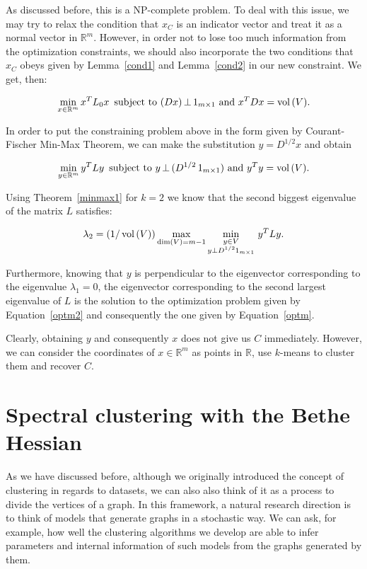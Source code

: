 As discussed before, this is a NP-complete problem.
To deal with this issue, we may try to relax the condition that $x_C$ is an indicator vector and treat it as a normal vector in $\mathbb R^{m }$.
However, in order not to lose too much information from the optimization constraints, we should also incorporate the two conditions that $x_C$ obeys given by Lemma~\ref{cond1} and Lemma~\vref{cond2} in our new constraint. We get, then:

\begin{equation}
   \min_{x \in \mathbb R^{m }} {x}^TL_0{x}\,\text{ subject to } (Dx)\, \bot \, 1_{m \times 1}  \text{ and } x^T D x = \operatorname*{vol\,} (V).
\end{equation}

In order to put the constraining problem above in the form given by Courant-Fischer Min-Max Theorem, we can make the substitution $y = D^{1/2}x$ and obtain

\begin{equation} \label{optm}
   \min_{y \in \mathbb R^{m }} y^TLy \,\text{ subject to } y \, \bot \, (D^{1/2} \,1_{m \times 1}) \text{ and } y^T y = \operatorname*{vol\,} (V).
\end{equation}

Using Theorem~\vref{minmax1} for $k = 2$ we know that the second biggest eigenvalue of the matrix $L$ satisfies:

\begin{equation}\label{optm2}
   \lambda_2 = \left( 1/\operatorname*{vol\,}(V) \right) \max_{\dim (V) = m-1} \min_{\substack{y \in V \\ y \bot D^{1/2}1_{m \times 1}}} \, y^TLy.
\end{equation}

Furthermore, knowing that $y$ is perpendicular to the eigenvector corresponding to the eigenvalue $\lambda_1 = 0$, the eigenvector corresponding to the second largest eigenvalue of $L$ is the solution to the optimization problem given by Equation~\ref{optm2} and consequently the one given by Equation~\ref{optm}.

Clearly, obtaining $y$ and consequently $x$ does not give us $C$ immediately.
However, we can consider the coordinates of $x \in \mathbb R^{m }$ as points in $\mathbb R$, use $k$-means to cluster them and recover $C$.

\chapter{Spectral clustering with the Bethe Hessian} \label{bethechapter}
As we have discussed before, although we originally introduced the concept of clustering in regards to datasets, we can also also think of it as a process to divide the vertices of a graph.
In this framework, a natural research direction is to think of models that generate graphs in a stochastic way. We can ask, for example, how well the clustering algorithms we develop are able to infer parameters and internal information of such models from the graphs generated by them.

